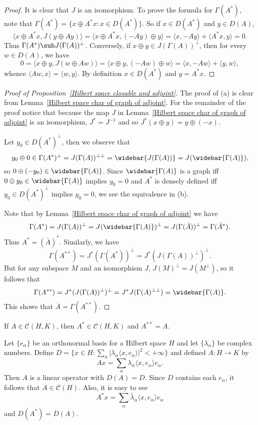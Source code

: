 \begin{proof}
It is clear that $J$ is an isomorphism. To prove the formula for $\Gamma(A^*)$, note that $\Gamma(A^*)=\{x\oplus A^*x:x\in D(A^*)\}$. So if $x\in D(A^*)$ and $y\in D(A)$,
\[\langle x\oplus A^*x,J(y\oplus Ay)\rangle=\langle x\oplus A^*x,(-Ay)\oplus y\rangle=\langle x,-Ay\rangle+\langle A^*x,y\rangle=0.\]
Thus $\Gamma(A^*)\sub J(\Gamma(A))^\bot$. Conversely, if $x\oplus y\in J(\Gamma(A))^\bot$, then for every $w\in D(A)$, we have
\[0=\langle x\oplus y,J(w\oplus Aw)\rangle=\langle x\oplus y,(-Aw)\oplus w\rangle=\langle x,-Aw\rangle+\langle y,w\rangle,\]
whence $\langle Aw,x\rangle=\langle w,y\rangle$. By definition $x\in D(A^*)$ and $y=A^*x$.
\end{proof}
\begin{proof}[Proof of Proposition~\ref{Hilbert space closable and adjoint}]
The proof of (a) is clear from Lemma~\ref{Hilbert space char of graph of adjoint}. For the remainder of the proof notice that because the map $J$ in Lemma~\ref{Hilbert space char of graph of adjoint} is an isomorphism, $J^*=J^{-1}$ and so $J^*(x\oplus y)=y\oplus(-x)$.\par
Let $y_0\in D(A^*)^\bot$, then we observe that
\[y_0\oplus 0\in\Gamma(A^*)^\bot=J(\Gamma(A))^{\bot\bot}=\widebar{J(\Gamma(A))}=J(\widebar{\Gamma(A)}),\]
so $0\oplus(-y_0)\in\widebar{\Gamma(A)}$. Since $\widebar{\Gamma(A)}$ is a graph iff $0\oplus y_0\in\widebar{\Gamma(A)}$ implies $y_0=0$ and $A^*$ is densely defined iff $y_0\in D(A^*)^\bot$ implies $y_0=0$, we see the equivalence in (b).\par
Note that by Lemma~\ref{Hilbert space char of graph of adjoint} we have
\[\Gamma(A^*)=J(\Gamma(A))^\bot=J(\widebar{\Gamma(A)})^\bot=J(\Gamma(\bar{A}))^\bot=\Gamma(\bar{A}^*).\]
Thus $A^*=(\bar{A})^*$. Similarly, we have
\[\Gamma(A^{**})=J^*(\Gamma(A^*))^\bot=J^*(J(\Gamma(A))^\bot)^\bot.\]
But for any subspace $M$ and an isomorphism $J$, $J(M)^\bot=J(M^\bot)$, so it follows that
\[\Gamma(A^{**})=J^*(J(\Gamma(A))^\bot)^\bot=J^*J(\Gamma(A)^{\bot\bot})=\widebar{\Gamma(A)}.\]
This shows that $\bar{A}=\Gamma(A^{**})$.
\end{proof}
\begin{corollary}
If $A\in\mathcal{C}(H,K)$, then $A^*\in\mathcal{C}(H,K)$ and $A^{**}=A$.
\end{corollary}
\begin{example}\label{Hilbert space diagonal unbounded operator}
Let $\{e_\alpha\}$ be an orthonormal basis for a Hilbert space $H$ and let $\{\lambda_\alpha\}$ be complex numbers. Define $D=\{x\in H:\sum_n|\lambda_\alpha\langle x,e_\alpha\rangle|^2<+\infty\}$ and defined $A:H\to K$ by
\[Ax=\sum_\alpha\lambda_\alpha\langle x,e_\alpha\rangle e_\alpha.\]
Then $A$ is a linear operator with $D(A)=D$. Since $D$ contains each $e_n$, it follows that $A\in\mathcal{C}(H)$. Also, it is easy to see
\[A^*x=\sum_\alpha\bar{\lambda}_\alpha\langle x,e_\alpha\rangle e_\alpha\]
and $D(A^*)=D(A)$.
\end{example}
